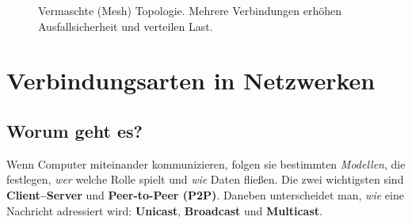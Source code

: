 \documentclass[../skript/main.tex]{subfiles}
\begin{document}
\begin{itemize}
\begin{figure}[H]
		\caption{Vermaschte (Mesh) Topologie. Mehrere Verbindungen erhöhen Ausfallsicherheit und verteilen Last.}
	\end{figure}
\end{itemize}	

\section{Verbindungsarten in Netzwerken}\label{sec:verbindungsarten}
\subsection*{Worum geht es?}
Wenn Computer miteinander kommunizieren, folgen sie bestimmten \emph{Modellen}, die festlegen, \emph{wer} welche Rolle spielt und \emph{wie} Daten fließen. Die zwei wichtigsten sind \textbf{Client–Server} und \textbf{Peer-to-Peer (P2P)}. Daneben unterscheidet man, \emph{wie} eine Nachricht adressiert wird: \textbf{Unicast}, \textbf{Broadcast} und \textbf{Multicast}.
\end{document}
